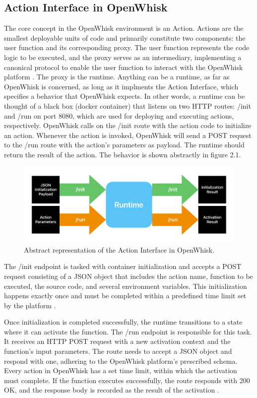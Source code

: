 \subsection{Action Interface in OpenWhisk}
The core concept in the OpenWhisk environment is an Action. Actions are the smallest deployable units of code and primarily constitute two components: the user function and its corresponding proxy. The user function represents the code logic to be executed, and the proxy serves as an intermediary, implementing a canonical protocol to enable the user function to interact with the OpenWhisk platform \cite{action-interface}. The proxy is the runtime. Anything can be a runtime, as far as OpenWhisk is concerned, as long as it implments the Action Interface, which specifies a behavior that OpenWhisk expects. In other words, a runtime can be thought of a black box (docker container) that listens on two HTTP routes: /init and /run on port 8080, which are used for deploying and executing actions, respectively. OpenWhisk calls on the /init route with the action code to initialize an action. Whenever the action is invoked, OpenWhisk will send a POST request  to the /run route with the action's parameters as payload. The runtime should return the result of the action. The behavior is shown abstractly in figure 2.1.
\begin{figure}[h]
    \centering
    \includegraphics[width=\textwidth]{media/action_interface.pdf}
    \caption{Abstract representation of the Action Interface in OpenWhisk.}
    \label{fig:actioninterface}
\end{figure}

The /init endpoint is tasked with container initialization and accepts a POST request consisting of a JSON object that includes the action name, function to be executed, the source code, and several environment variables. This initialization happens exactly once and must be completed within a predefined time limit set by the platform \cite{action-interface}.

Once initialization is completed successfully, the runtime transitions to a state where it can activate the function. The /run endpoint is responsible for this task. It receives an HTTP POST request with a new activation context and the function's input parameters. The route needs to accept a JSON object and respond with one, adhering to the OpenWhisk platform's prescribed schema. Every action in OpenWhisk has a set time limit, within which the activation must complete. If the function executes successfully, the route responds with 200 OK, and the response body is recorded as the result of the activation \cite{openwhisk2023}.

